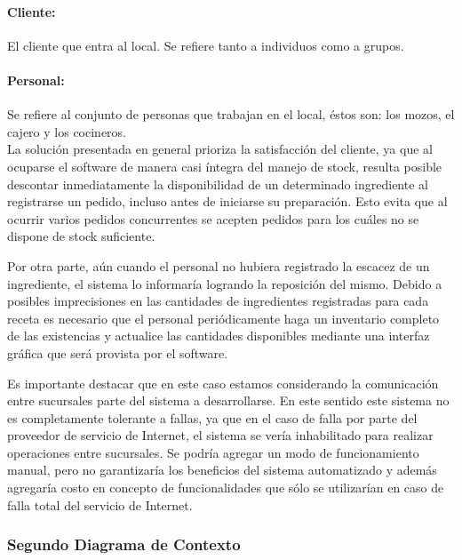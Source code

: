 \documentclass[a4paper,10pt]{article}
\begin{document}
\paragraph{Cliente:}
El cliente que entra al local. Se refiere tanto a individuos como a grupos.
\\
\paragraph{Personal:}
Se refiere al conjunto de personas que trabajan en el local, éstos son: los mozos, el cajero y los cocineros.
\\

La solución presentada en general prioriza la satisfacción del cliente, ya que al ocuparse el software de manera casi íntegra del manejo de stock, resulta posible descontar inmediatamente la disponibilidad de un determinado ingrediente al registrarse un pedido, incluso antes de iniciarse su preparación. Esto evita que al ocurrir varios pedidos concurrentes se acepten pedidos para los cuáles no se dispone de stock suficiente.

Por otra parte, aún cuando el personal no hubiera registrado la escacez de un ingrediente, el sistema lo informaría logrando la reposición del mismo. Debido a posibles imprecisiones en las cantidades de ingredientes registradas para cada receta es necesario que el personal periódicamente haga un inventario completo de las existencias y actualice las cantidades disponibles mediante una interfaz gráfica que será provista por el software.

Es importante destacar que en este caso estamos considerando la comunicación entre sucursales parte del sistema a desarrollarse. En este sentido este sistema no es completamente tolerante a fallas, ya que en el caso de falla por parte del proveedor de servicio de Internet, el sistema se vería inhabilitado para realizar operaciones entre sucursales. Se podría agregar un modo de funcionamiento manual, pero no garantizaría los beneficios del sistema automatizado y además agregaría costo en concepto de funcionalidades que sólo se utilizarían en caso de falla total del servicio de Internet. 



\subsubsection*{Segundo Diagrama de Contexto}
\end{document}
